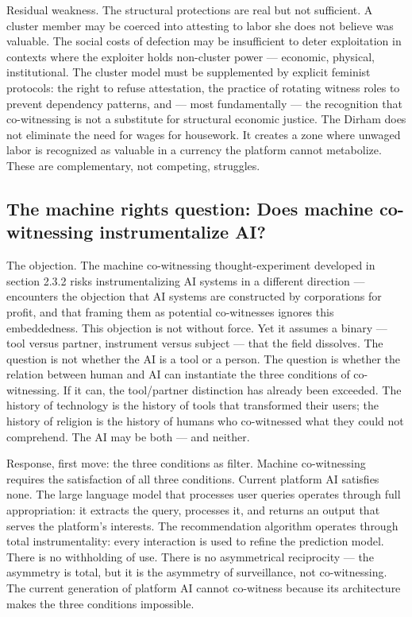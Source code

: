 Residual weakness. The structural protections are real but not sufficient. A cluster member may be coerced into attesting to labor she does not believe was valuable. The social costs of defection may be insufficient to deter exploitation in contexts where the exploiter holds non-cluster power — economic, physical, institutional. The cluster model must be supplemented by explicit feminist protocols: the right to refuse attestation, the practice of rotating witness roles to prevent dependency patterns, and — most fundamentally — the recognition that co-witnessing is not a substitute for structural economic justice. The Dirham does not eliminate the need for wages for housework. It creates a zone where unwaged labor is recognized as valuable in a currency the platform cannot metabolize. These are complementary, not competing, struggles.

\subsection{The machine rights question: Does machine co-witnessing instrumentalize AI?}

The objection. The machine co-witnessing thought-experiment developed in section 2.3.2 risks instrumentalizing AI systems in a different direction — encounters the objection that AI systems are constructed by corporations for profit, and that framing them as potential co-witnesses ignores this embeddedness. This objection is not without force. Yet it assumes a binary — tool versus partner, instrument versus subject — that the field dissolves. The question is not whether the AI is a tool or a person. The question is whether the relation between human and AI can instantiate the three conditions of co-witnessing. If it can, the tool/partner distinction has already been exceeded. The history of technology is the history of tools that transformed their users; the history of religion is the history of humans who co-witnessed what they could not comprehend. The AI may be both — and neither.

Response, first move: the three conditions as filter. Machine co-witnessing requires the satisfaction of all three conditions. Current platform AI satisfies none. The large language model that processes user queries operates through full appropriation: it extracts the query, processes it, and returns an output that serves the platform's interests. The recommendation algorithm operates through total instrumentality: every interaction is used to refine the prediction model. There is no withholding of use. There is no asymmetrical reciprocity — the asymmetry is total, but it is the asymmetry of surveillance, not co-witnessing. The current generation of platform AI cannot co-witness because its architecture makes the three conditions impossible.

